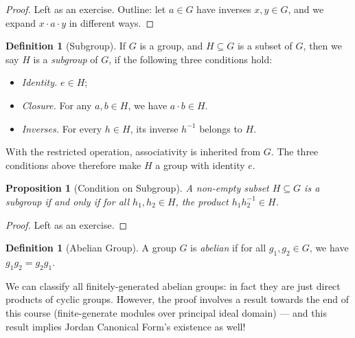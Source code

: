 \documentclass{article}
\newtheorem{proposition}[theorem]{Proposition}
\theoremstyle{definition}
\newtheorem{definition}[theorem]{Definition}
\theoremstyle{remark}
\newcommand{\inverse}{^{-1}}
\begin{document}
\begin{proof}
    Left as an exercise. Outline: let \(a \in G\) have inverses \(x, y \in G\), and we expand \(x \cdot a \cdot y\) in different ways.
\end{proof}

\begin{definition}[Subgroup]
    \label{def:subgroup}%
    If \(G\) is a group, and \(H \subseteq G\) is a subset of \(G\), then we say \(H\) is a \emph{subgroup} of \(G\), if the following three conditions hold:
    \begin{itemize}
        \item \emph{Identity.} \(e \in H\);
        \item \emph{Closure.} For any \(a, b \in H\), we have \(a \cdot b \in H\).
        \item \emph{Inverses.} For every \(h\in H\), its inverse \(h^{-1}\) belongs to \(H\).
    \end{itemize}
\end{definition}

With the restricted operation, associativity is inherited from $G$. The three conditions above therefore make $H$ a group with identity $e$.

\begin{proposition}[Condition on Subgroup]
    \label{prop:condition-subgroup}%
    A \emph{non-empty} subset \(H \subseteq G\) is a subgroup if and only if for all \(h_1, h_2 \in H\), the product \(h_1 h_2\inverse \in H\).
\end{proposition}

\begin{proof}
    Left as an exercise.
\end{proof}

\begin{definition}[Abelian Group]
    \label{def:abelian-groups}%
    A group \(G\) is \emph{abelian} if for all \(g_1, g_2 \in G\), we have \(g_1 g_2 = g_2 g_1\).
\end{definition}

We can classify all finitely-generated abelian groups: in fact they are just direct products of cyclic groups. However, the proof involves a result towards the end of this course (finite-generate modules over principal ideal domain) --- and this result implies Jordan Canonical Form's existence as well!
\end{document}
